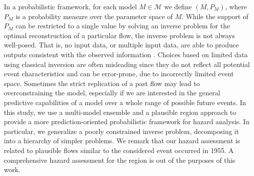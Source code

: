 \documentclass[nhess, manuscript]{copernicus}
\begin{document}
In a probabilistic framework, for each model $M\in\mathcal M$ we define $\left(M, P_{M}\right)$, where $P_M$ is a probability measure over the parameter space of $M$. While the support of $P_M$ can be restricted to a single value by solving an inverse problem for the optimal reconstruction of a particular flow, the inverse problem is not always well-posed. That is, no input data, or multiple input data, are able to produce outputs consistent with the observed information \citep{Tarantola1982,  Tarantola1987}. Choices based on limited data using classical inversion are often misleading since they do not reflect all potential event characteristics and can be error-prone, due to incorrectly limited event space. Sometimes the strict replication of a past flow may lead to overconstraining the model, especially if we are interested in the general predictive capabilities of a model over a whole range of possible future events. In this study, we use a multi-model ensemble and a plausible region approach to provide a more prediction-oriented probabilistic framework for hazard analysis. In particular, we generalize a poorly constrained inverse problem, decomposing it into a hierarchy of simpler problems. We remark that our hazard assessment is related to plausible flows similar to the considered event occurred in 1955. A comprehensive hazard assessment for the region is out of the purposes of this work.
\end{document}
